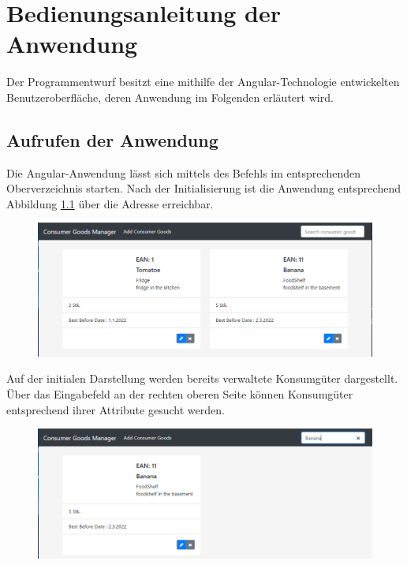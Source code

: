 \chapter{Bedienungsanleitung der Anwendung}
\label{Bedienungsanleitung}
Der Programmentwurf besitzt eine mithilfe der Angular-Technologie entwickelten Benutzeroberfläche, deren Anwendung im Folgenden erläutert wird.

\section{Aufrufen der Anwendung}
Die Angular-Anwendung lässt sich mittels des Befehls  im entsprechenden Oberverzeichnis starten.
Nach der Initialisierung ist die Anwendung entsprechend Abbildung \ref{fig:gui-initial-screen} über die Adresse  erreichbar.

\begin{figure}[H]
	\centering
	\includegraphics[width=1.0\textwidth]{Bilder/gui/gui-initial-screen.PNG}
	\caption[]{}
	\label{fig:gui-initial-screen}
\end{figure}

Auf der initialen Darstellung werden bereits verwaltete Konsumgüter dargestellt.
Über das Eingabefeld an der rechten oberen Seite können Konsumgüter entsprechend ihrer Attribute gesucht werden.

\begin{figure}[H]
	\centering
	\includegraphics[width=1.0\textwidth]{Bilder/gui/gui-search.PNG}
	\caption[]{}
	\label{fig:gui-search}
\end{figure}

